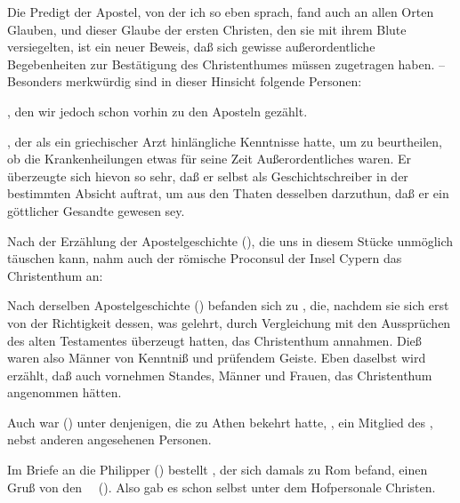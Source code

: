 Die Predigt der Apostel, von der ich so eben sprach, fand auch an allen Orten Glauben, und dieser Glaube der ersten Christen, den sie mit ihrem Blute versiegelten, ist ein neuer Beweis, daß sich gewisse außerordentliche Begebenheiten zur Bestätigung des Christenthumes müssen zugetragen haben. -- Besonders merkwürdig sind in dieser Hinsicht folgende Personen:
\begin{aufza}
\item {}, den wir jedoch schon vorhin zu den Aposteln gezählt.
\item {}, der als ein griechischer Arzt hinlängliche Kenntnisse hatte, um zu beurtheilen, ob die Krankenheilungen  etwas für seine Zeit Außerordentliches waren. Er überzeugte sich hievon so sehr, daß er selbst als Geschichtschreiber  in der bestimmten Absicht auftrat, um aus den Thaten desselben darzuthun, daß er ein göttlicher Gesandte gewesen sey.
\item Nach der Erzählung der Apostelgeschichte (), die uns in diesem Stücke unmöglich täuschen kann, nahm auch der römische Proconsul der Insel Cypern  das Christenthum an:
\item Nach derselben Apostelgeschichte () befanden sich zu , die, nachdem sie sich erst von der Richtigkeit dessen, was  gelehrt, durch Vergleichung mit den Aussprüchen des alten Testamentes überzeugt hatten, das Christenthum annahmen. Dieß waren also Männer von Kenntniß und prüfendem Geiste. Eben daselbst wird erzählt, daß auch  vornehmen Standes, Männer und Frauen, das Christenthum angenommen hätten.
\item Auch war () unter denjenigen, die  zu Athen bekehrt hatte, , ein Mitglied des , nebst anderen angesehenen Personen.
\item Im Briefe an die Philipper () bestellt , der sich damals zu Rom befand, einen Gruß von den~\  (). Also gab es schon selbst unter dem Hofpersonale Christen.

\end{aufza}
